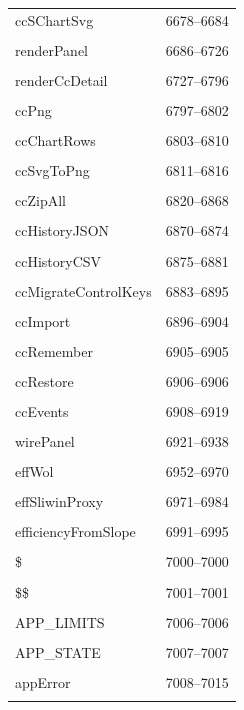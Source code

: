 {\begin{longtable}{@{}p{11cm}r@{}}
ccSChartSvg & 6678--6684 \\\\\hline
renderPanel & 6686--6726 \\\\\hline
renderCcDetail & 6727--6796 \\\\\hline
ccPng & 6797--6802 \\\\\hline
ccChartRows & 6803--6810 \\\\\hline
ccSvgToPng & 6811--6816 \\\\\hline
ccZipAll & 6820--6868 \\\\\hline
ccHistoryJSON & 6870--6874 \\\\\hline
ccHistoryCSV & 6875--6881 \\\\\hline
ccMigrateControlKeys & 6883--6895 \\\\\hline
ccImport & 6896--6904 \\\\\hline
ccRemember & 6905--6905 \\\\\hline
ccRestore & 6906--6906 \\\\\hline
ccEvents & 6908--6919 \\\\\hline
wirePanel & 6921--6938 \\\\\hline
effWol & 6952--6970 \\\\\hline
effSliwinProxy & 6971--6984 \\\\\hline
efficiencyFromSlope & 6991--6995 \\\\\hline
\$ & 7000--7000 \\\\\hline
\$\$ & 7001--7001 \\\\\hline
APP\_LIMITS & 7006--7006 \\\\\hline
APP\_STATE & 7007--7007 \\\\\hline
appError & 7008--7015 \\\\\hline

\end{longtable}}
